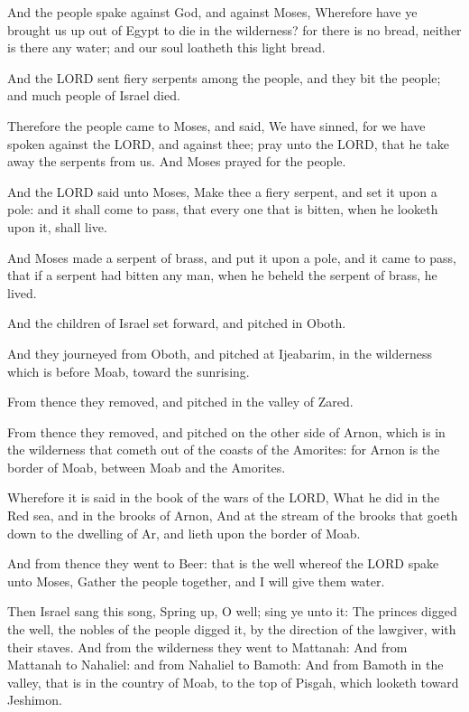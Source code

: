 \verse And the people spake against God, and against Moses, Wherefore
have ye brought us up out of Egypt to die in the wilderness? for there
is no bread, neither is there any water; and our soul loatheth this
light bread.

\verse And the LORD sent fiery serpents among the people, and they bit
the people; and much people of Israel died.

\verse Therefore the people came to Moses, and said, We have sinned, for
we have spoken against the LORD, and against thee; pray unto the LORD,
that he take away the serpents from us. And Moses prayed for the
people.

\verse And the LORD said unto Moses, Make thee a fiery serpent, and set
it upon a pole: and it shall come to pass, that every one that is
bitten, when he looketh upon it, shall live.

\verse And Moses made a serpent of brass, and put it upon a pole, and it
came to pass, that if a serpent had bitten any man, when he beheld the
serpent of brass, he lived.

\verse And the children of Israel set forward, and pitched in Oboth.

\verse And they journeyed from Oboth, and pitched at Ijeabarim, in the
wilderness which is before Moab, toward the sunrising.

\verse From thence they removed, and pitched in the valley of Zared.

\verse From thence they removed, and pitched on the other side of
Arnon, which is in the wilderness that cometh out of the coasts of the
Amorites: for Arnon is the border of Moab, between Moab and the
Amorites.

\verse Wherefore it is said in the book of the wars of the LORD, What
he did in the Red sea, and in the brooks of Arnon, \verse And at the
stream of the brooks that goeth down to the dwelling of Ar, and lieth
upon the border of Moab.

\verse And from thence they went to Beer: that is the well whereof the
LORD spake unto Moses, Gather the people together, and I will give
them water.

\verse Then Israel sang this song, Spring up, O well; sing ye unto it:
\verse The princes digged the well, the nobles of the people digged it,
by the direction of the lawgiver, with their staves. And from the
wilderness they went to Mattanah: \verse And from Mattanah to Nahaliel:
and from Nahaliel to Bamoth: \verse And from Bamoth in the valley, that
is in the country of Moab, to the top of Pisgah, which looketh toward
Jeshimon.

